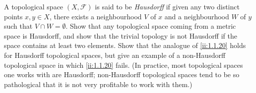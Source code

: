 \begin{ex}\label{ii:ex:2.5.4}
  A topological space \((X, \mathcal{F})\) is said to be \emph{Hausdorff} if given any two distinct points \(x, y \in X\), there exists a neighbourhood \(V\) of \(x\) and a neighbourhood \(W\) of \(y\) such that \(V \cap W = \emptyset\).
  Show that any topological space coming from a metric space is Hausdorff, and show that the trivial topology is not Hausdorff if the space contains at least two elements.
  Show that the analogue of \cref{ii:1.1.20} holds for Hausdorff topological spaces, but give an example of a non-Hausdorff topological space in which \cref{ii:1.1.20} fails.
  (In practice, most topological spaces one works with are Hausdorff;
  non-Hausdorff topological spaces tend to be so pathological that it is not very profitable to work with them.)
\end{ex}


